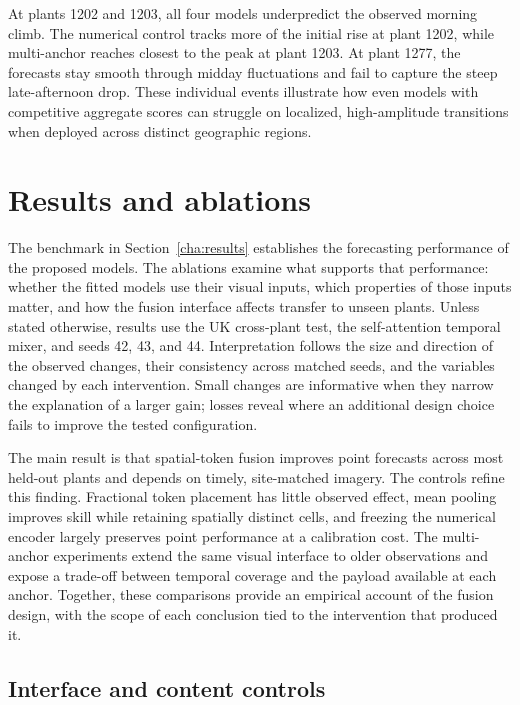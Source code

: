 At plants 1202 and 1203, all four models underpredict the observed morning climb. The numerical control tracks more of the initial rise at plant 1202, while multi-anchor reaches closest to the peak at plant 1203. At plant 1277, the forecasts stay smooth through midday fluctuations and fail to capture the steep late-afternoon drop. These individual events illustrate how even models with competitive aggregate scores can struggle on localized, high-amplitude transitions when deployed across distinct geographic regions.

\section{Results and ablations}
\label{cha:ablations}

The benchmark in Section~\ref{cha:results} establishes the forecasting performance of the proposed models. The ablations examine what supports that performance: whether the fitted models use their visual inputs, which properties of those inputs matter, and how the fusion interface affects transfer to unseen plants. Unless stated otherwise, results use the UK cross-plant test, the self-attention temporal mixer, and seeds 42, 43, and 44. Interpretation follows the size and direction of the observed changes, their consistency across matched seeds, and the variables changed by each intervention. Small changes are informative when they narrow the explanation of a larger gain; losses reveal where an additional design choice fails to improve the tested configuration.

The main result is that spatial-token fusion improves point forecasts across most held-out plants and depends on timely, site-matched imagery. The controls refine this finding. Fractional token placement has little observed effect, mean pooling improves skill while retaining spatially distinct cells, and freezing the numerical encoder largely preserves point performance at a calibration cost. The multi-anchor experiments extend the same visual interface to older observations and expose a trade-off between temporal coverage and the payload available at each anchor. Together, these comparisons provide an empirical account of the fusion design, with the scope of each conclusion tied to the intervention that produced it.

\subsection{Interface and content controls}

